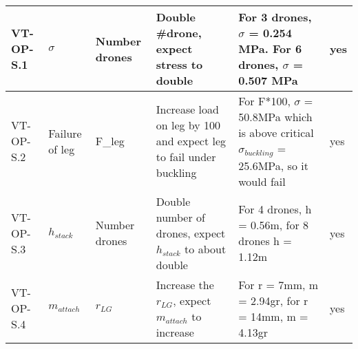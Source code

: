 \begin{longtable}[c]{|p{1.25cm}|p{1.25cm}|p{1.25cm}|p{4.5cm}|p{5.5cm}|p{0.5cm}|}
VT-OP-S.1 & $\sigma$ & Number drones & Double #drone, expect stress to double & For 3 drones, $\sigma$ = 0.254 MPa. For 6 drones, $\sigma$ =  0.507 MPa & yes\cellcolor[HTML]{C1FFC1} \\ \hline
VT-OP-S.2 & Failure of leg & F_{leg} & Increase load on leg by 100 and expect leg to fail under buckling & For F*100, $\sigma$ = 50.8MPa which is above critical 
$\sigma_{buckling}$ = 25.6MPa, so it would fail & yes\cellcolor[HTML]{C1FFC1} \\ \hline
VT-OP-S.3 & $h_{stack}$ & Number drones & Double number of drones, expect $h_{stack}$ to about double & For 4 drones, h = 0.56m, for 8 drones h = 1.12m & yes\cellcolor[HTML]{C1FFC1} \\ \hline
VT-OP-S.4 & $m_{attach}$ & $r_{LG}$ & Increase the $r_{LG}$, expect $m_{attach}$ to increase & For r = 7mm, m = 2.94gr, for r = 14mm, m = 4.13gr & yes\cellcolor[HTML]{C1FFC1} \\ \hline

\end{longtable}

